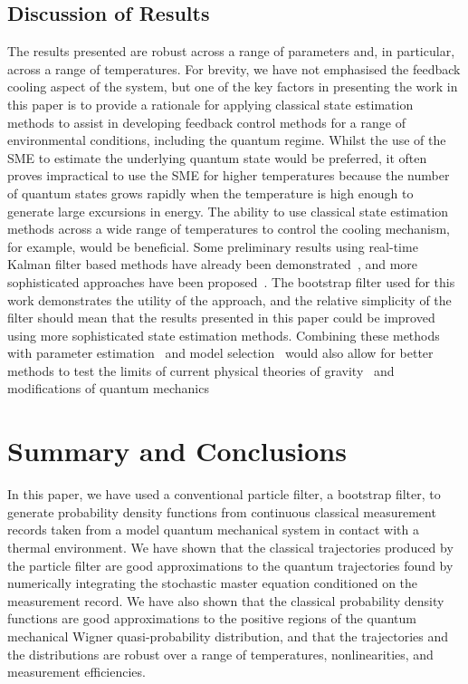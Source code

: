 \documentclass[conference]{IEEEtran}
\begin{document}
\subsection{Discussion of Results}\label{discussion}
The results presented are robust across a range of parameters and, in particular, across a range of temperatures. For brevity, we have not emphasised the feedback cooling aspect of the system, but one of the key factors in presenting the work in this paper is to provide a rationale for applying classical state estimation methods to assist in developing feedback control methods for a range of environmental conditions, including the quantum regime. Whilst the use of the SME to estimate the underlying quantum state would be preferred, it often proves impractical to use the SME for higher temperatures because the number of quantum states grows rapidly when the temperature is high enough to generate large excursions in energy. The ability to use classical state estimation methods across a wide range of temperatures to control the cooling mechanism, for example, would be beneficial. Some preliminary results using real-time Kalman filter based methods have already been demonstrated~\cite{Set2018}, and more sophisticated approaches have been proposed~\cite{Fer2019}. The bootstrap filter used for this work demonstrates the utility of the approach, and the relative simplicity of the filter should mean that the results presented in this paper could be improved using more sophisticated state estimation methods. Combining these methods with parameter estimation~\cite{Ral2017} and model selection~\cite{Ral2018} would also allow for better methods to test the limits of current physical theories of gravity~\cite{Ger2010,Arv2013} and modifications of quantum mechanics~\cite{Bas2003,Bas2013,Ber2015}

\section{Summary and Conclusions}\label{conclusions}
In this paper, we have used a conventional particle filter, a bootstrap filter, to generate probability density functions from continuous classical measurement records taken from a model quantum mechanical system in contact with a thermal environment. We have shown that the classical trajectories produced by the particle filter are good approximations to the quantum trajectories found by numerically integrating the stochastic master equation conditioned on the measurement record. We have also shown that the classical probability density functions are good approximations to the positive regions of the quantum mechanical Wigner quasi-probability distribution, and that the trajectories and the distributions are robust over a range of temperatures, nonlinearities, and measurement efficiencies. 
\end{document}
